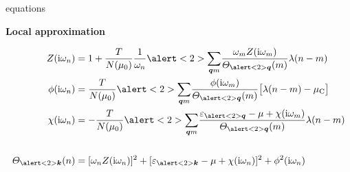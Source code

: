 \documentclass[10pt]{beamer}
\begin{document}
    \begin{frame}[label=Eliashberg3]{ equations}
        \begin{center} \bf
            Local approximation
        \end{center}
        \begin{align*}
            Z(\I \omega_n) &= 1 + \frac T {N(\mu_0)} \frac 1 {\omega_n}
            \alert<2>{\sum_{\vec q \color{black} m}} \frac
                {\omega_m Z\vphantom{_{\vec q}}(\I \omega_m)}
                {\Theta_{\alert<2>{\vec q}}(m)}
            \lambda(n - m)
            \\
            \phi(\I \omega_n) &= \frac T {N(\mu_0)}
            \alert<2>{\sum_{\vec q \color{black} m}} \frac
                {\phi\vphantom{_{\vec q}}(\I \omega_m)}
                {\Theta_{\alert<2>{\vec q}}(m)}
            \big[ \lambda(n - m) - \mu \sub C \big]
            \\
            \chi(\I \omega_n) &= -\frac T {N(\mu_0)}
            \alert<2>{\sum_{\vec q \color{black} m}} \frac
                { \epsilon_{\alert<2>{\vec q}} - \mu
                + \chi\vphantom{_{\vec q}}(\I \omega_m) }
                {\Theta_{\alert<2>{\vec q}}(m)}
            \lambda(n - m)
            \\
            \hspace{2cm} & \hspace{8cm}
            \\
            \Theta_{\alert<2>{\vec k}}(n) &= [\omega_n Z(\I \omega_n)]^2
            + [\epsilon_{\alert<2>{\vec k}} - \mu + \chi(\I \omega_n)]^2
            + \phi^2(\I \omega_n)
        \end{align*}
    \end{frame}
\end{document}
